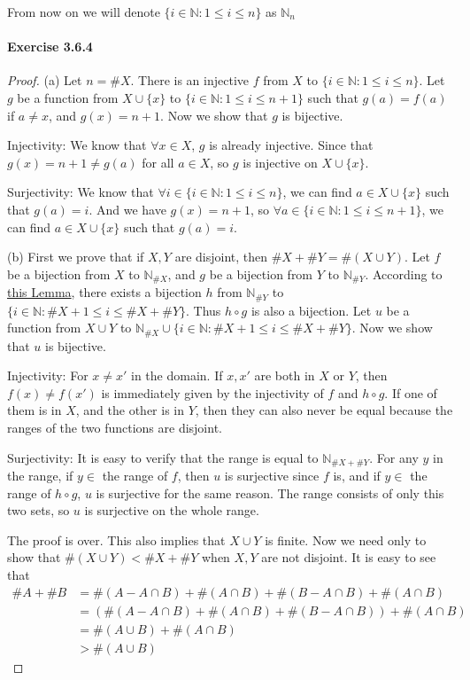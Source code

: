 From now on we will denote $\{i\in \mathbb{N}:1\leq i \leq n\}$ as $\mathbb{N}_n$

\paragraph{Exercise 3.6.4} \label{exercise3.6.4}
\begin{proof}
(a) 
Let $n = \#X$. There is an injective  $f$ from $X$ to $\{i\in \mathbb{N}:1\leq i\leq n\}$. Let $g$ be a 
function from $X \cup \{x\}$ to $\{i\in \mathbb{N}:1\leq i\leq n+1\}$ such that $g(a) = f(a)$ if 
$a\neq x$, and $g(x) = n+1$. Now we show that $g$ is bijective.

Injectivity: We know that $\forall x \in X$, $g$ is already injective. Since that $g(x) = n+1 \neq g(a)$ 
for all $a \in X$, so $g$ is injective on $X \cup \{x\}$.

Surjectivity: We know that $\forall i \in \{i\in \mathbb{N}:1\leq i\leq n\}$, we can find 
$a \in X \cup \{x\}$ such that $g(a) = i$. And we have $g(x) = n+1$, so 
$\forall a \in \{i\in \mathbb{N}:1\leq i\leq n+1\}$, we can find $a \in X \cup \{x\}$ such that 
$g(a) = i$. 

(b)
First we prove that if $X,Y$ are disjoint, then $\#X + \#Y = \#(X\cup Y)$. Let $f$ be a bijection from $X$ 
to $\mathbb{N}_{\#X}$, and $g$ be a bijection from $Y$ to $\mathbb{N}_{\#Y}$. According to 
\hyperref[lem3.6.6]{this Lemma}, there exists a bijection $h$ from $\mathbb{N}_{\#Y}$ to 
$\{i\in \mathbb{N}:\#X+1\leq i \leq \#X+\#Y\}$. Thus $h \circ g$ is also a bijection. Let $u$ be a 
function from $X \cup Y$ to $\mathbb{N}_{\#X} \cup\{i\in \mathbb{N}:\#X+1\leq i \leq \#X+\#Y\}$. Now we 
show that $u$ is bijective.

Injectivity: For $x \neq x'$ in the domain. If $x,x'$ are both in $X$ or $Y$, then $f(x)\neq f(x')$ is 
immediately given by the injectivity of $f$ and $h \circ g$. If one of them is in $X$, and the other is 
in $Y$, then they can also never be equal because the ranges of the two functions are disjoint. 

Surjectivity: It is easy to verify that the range is equal to $\mathbb{N}_{\#X + \#Y}$. For any $y$ in the 
range, if $y \in$ the range of $f$, then $u$ is surjective since $f$ is, and if $y \in$ the range of $h 
\circ g$, $u$ is surjective for the same reason. The range consists of only this two sets, so $u$ is 
surjective on the whole range.

The proof is over. This also implies that $X \cup Y$ is finite. Now we need only to show that 
$\#(X \cup Y) < \#X + \#Y$ when $X,Y$ are not disjoint. It is easy to see that
\begin{align*}
\#A + \#B 
&= \#(A - A \cap B) + \#(A \cap B) + \#(B - A \cap B) + \#(A \cap B) \\
&= (\#(A - A \cap B) + \#(A \cap B) + \#(B - A \cap B)) + \#(A \cap B) \\
&= \#(A \cup B) + \#(A \cap B) \\
&> \#(A \cup B)
\end{align*}


\end{proof}
